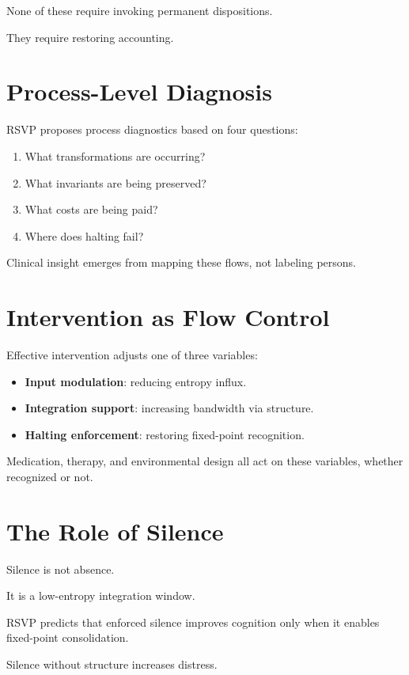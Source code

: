 \documentclass[11pt]{book}
\begin{document}
None of these require invoking permanent dispositions.

They require restoring accounting.

\section{Process-Level Diagnosis}

RSVP proposes process diagnostics based on four questions:

\begin{enumerate}
\item What transformations are occurring?
\item What invariants are being preserved?
\item What costs are being paid?
\item Where does halting fail?
\end{enumerate}

Clinical insight emerges from mapping these flows, not labeling persons.

\section{Intervention as Flow Control}

Effective intervention adjusts one of three variables:

\begin{itemize}
\item \textbf{Input modulation}: reducing entropy influx.
\item \textbf{Integration support}: increasing bandwidth via structure.
\item \textbf{Halting enforcement}: restoring fixed-point recognition.
\end{itemize}

Medication, therapy, and environmental design all act on these variables,
whether recognized or not.

\section{The Role of Silence}

Silence is not absence.

It is a low-entropy integration window.

RSVP predicts that enforced silence improves cognition only when it enables
fixed-point consolidation.

Silence without structure increases distress.
\end{document}
